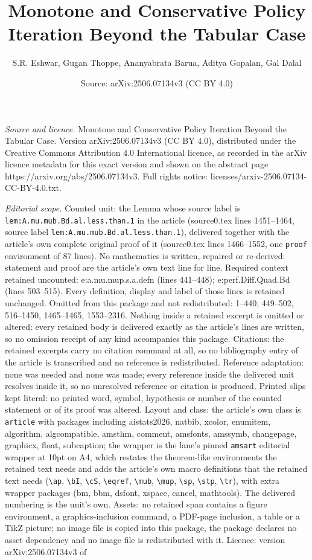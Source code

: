 \documentclass[10pt,a4paper]{amsart}
\title[Monotone and Conservative Policy Iteration Beyond the Tabula]{Monotone and Conservative Policy Iteration Beyond the Tabular Case}
\author{S.R. Eshwar, Gugan Thoppe, Ananyabrata Barua, Aditya Gopalan, Gal Dalal}
\date{Source: arXiv:2506.07134v3 (CC BY 4.0)}
\begin{document}
\maketitle

\noindent\emph{Source and licence.} Monotone and Conservative Policy Iteration Beyond the Tabular Case. Version arXiv:2506.07134v3 (CC BY 4.0), distributed under the Creative Commons Attribution 4.0 International licence, as recorded in the arXiv licence metadata for this exact version and shown on the abstract page https://arxiv.org/abs/2506.07134v3. Full rights notice: licenses/arxiv-2506.07134-CC-BY-4.0.txt.\par\smallskip

\noindent\textit{Editorial scope.} Counted unit: the Lemma whose source label is \texttt{lem:A.mu.mub.Bd.al.less.than.1} in the article (source0.tex lines 1451--1464, source label \texttt{lem:A.mu.mub.Bd.al.less.than.1}), delivered together with the article's own complete original proof of it (source0.tex lines 1466--1552, one \texttt{proof} environment of 87 lines). No mathematics is written, repaired or re-derived: statement and proof are the article's own text line for line. Required context retained uncounted: e:a.mu.mup.s.a.defn (lines 441--448); e:perf.Diff.Quad.Bd (lines 503--515). Every definition, display and label of those lines is retained unchanged. Omitted from this package and not redistributed: 1--440, 449--502, 516--1450, 1465--1465, 1553--2316. Nothing inside a retained excerpt is omitted or altered: every retained body is delivered exactly as the article's lines are written, so no omission receipt of any kind accompanies this package. Citations: the retained excerpts carry no citation command at all, so no bibliography entry of the article is transcribed and no reference is redistributed. Reference adaptation: none was needed and none was made; every reference inside the delivered unit resolves inside it, so no unresolved reference or citation is produced. Printed slips kept literal: no printed word, symbol, hypothesis or number of the counted statement or of its proof was altered. Layout and class: the article's own class is \texttt{article} with packages including aistats2026, natbib, xcolor, enumitem, algorithm, algcompatible, amsthm, comment, amsfonts, amssymb, changepage, graphicx, float, subcaption; the wrapper is the lane's pinned \texttt{amsart} editorial wrapper at 10pt on A4, which restates the theorem-like environments the retained text needs and adds the article's own macro definitions that the retained text needs (\texttt{\textbackslash ap}, \texttt{\textbackslash bI}, \texttt{\textbackslash cS}, \texttt{\textbackslash eqref}, \texttt{\textbackslash mub}, \texttt{\textbackslash mup}, \texttt{\textbackslash sp}, \texttt{\textbackslash stp}, \texttt{\textbackslash tr}), with extra wrapper packages (bm, bbm, dsfont, xspace, cancel, mathtools). The delivered numbering is the unit's own. Assets: no retained span contains a figure environment, a graphics-inclusion command, a PDF-page inclusion, a table or a TikZ picture; no image file is copied into this package, the package declares no asset dependency and no image file is redistributed with it. Licence: version arXiv:2506.07134v3 of 
\end{document}

